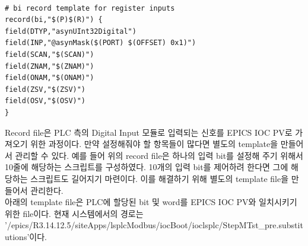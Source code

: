 \documentclass[11pt
  , a4paper
  , article
  , oneside
]{memoir}
\begin{document}
\begin{lstlisting}[style=termstyle]

# bi record template for register inputs
record(bi,"$(P)$(R)") {
field(DTYP,"asynUInt32Digital")
field(INP,"@asynMask($(PORT) $(OFFSET) 0x1)")
field(SCAN,"$(SCAN)")
field(ZNAM,"$(ZNAM)")
field(ONAM,"$(ONAM)")
field(ZSV,"$(ZSV)")
field(OSV,"$(OSV)")
}

\end{lstlisting}

Record file은 PLC 측의 Digital Input 모듈로 입력되는 신호를 EPICS IOC PV로 가져오기 위한 과정이다. 만약 설정해줘야 할 항목들이 많다면 별도의 template을 만들어서 관리할 수 있다. 예를 들어 위의 record file은 하나의 입력 bit를 설정해 주기 위해서 10줄에 해당하는 스크립트를 구성하였다. 10개의 입력 bit를 제어하려 한다면 그에 해당하는 스크립트도 길어지기 마련이다. 이를 해결하기 위해 별도의 template file을 만들어서 관리한다.\\

아래의 template file은 PLC에 할당된 bit 및 word를 EPICS IOC PV와 일치시키기 위한 file이다. 현재 시스템에서의 경로는 '/epics/R3.14.12.5/siteApps/lsplcModbus/iocBoot/ioclsplc/StepMTst\_pre.substitutions'이다. \\
\end{document}
